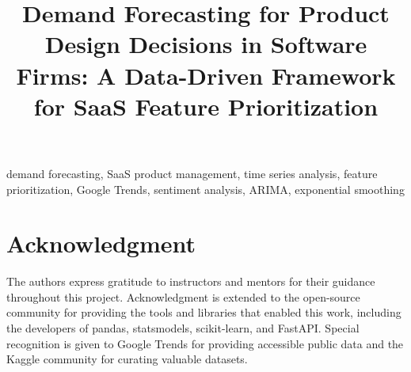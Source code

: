 \documentclass[conference]{IEEEtran}
\begin{document}
\title{Demand Forecasting for Product Design Decisions in Software Firms: A Data-Driven Framework for SaaS Feature Prioritization}

\author{
\and
{}
\and
{}
\and
{}
}

\maketitle

\begin{abstract}

\end{abstract}

\begin{IEEEkeywords}
demand forecasting, SaaS product management, time series analysis, feature prioritization, Google Trends, sentiment analysis, ARIMA, exponential smoothing
\end{IEEEkeywords}












\section*{Acknowledgment}
The authors express gratitude to instructors and mentors for their guidance throughout this project. Acknowledgment is extended to the open-source community for providing the tools and libraries that enabled this work, including the developers of pandas, statsmodels, scikit-learn, and FastAPI. Special recognition is given to Google Trends for providing accessible public data and the Kaggle community for curating valuable datasets.


\end{document}
